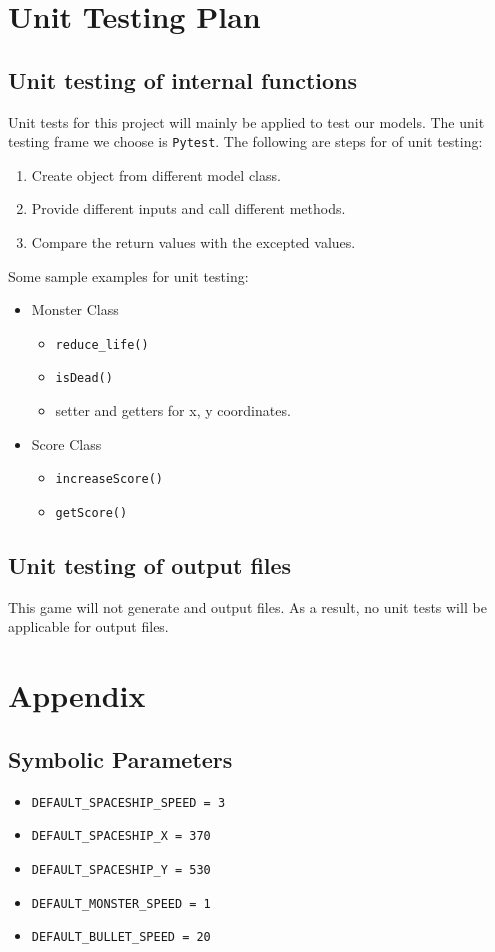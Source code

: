 \documentclass[12pt]{article}
\begin{document}
\section{Unit Testing Plan}
\subsection{Unit testing of internal functions}
Unit tests for this project will mainly be applied to test
our models. The unit testing frame we choose is \verb|Pytest|. The following are steps for of unit testing:
\begin{enumerate}[1.]
\item Create object from different model class.
\item Provide different inputs and call different methods.
\item Compare the return values with the excepted values.
\end{enumerate}
Some sample examples for  unit testing:
\begin{itemize}
\item Monster Class
\begin{itemize}
\item \verb|reduce_life()|
\item \verb|isDead()|
\item setter and getters for x, y coordinates.
\end{itemize}
\item Score Class
\begin{itemize}
\item \verb|increaseScore()|
\item \verb|getScore()|
\end{itemize}
\end{itemize}
\subsection{Unit testing of output files}
This game will not generate and output files. As a result,
no unit tests will be applicable for output files.
\section{Appendix}
\subsection{Symbolic Parameters}
\begin{itemize}
\item \verb|DEFAULT_SPACESHIP_SPEED = 3|
\item \verb|DEFAULT_SPACESHIP_X = 370|
\item \verb|DEFAULT_SPACESHIP_Y = 530|
\item \verb|DEFAULT_MONSTER_SPEED = 1|
\item \verb|DEFAULT_BULLET_SPEED = 20|
\end{itemize}
\end{document}
